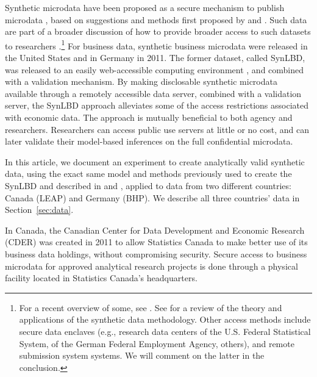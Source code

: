 Synthetic microdata have been proposed as a secure mechanism to publish microdata \citep{RePEc:spr:alstar:v:95:y:2011:i:1:p:1-26,RePEc:taf:japsta:v:39:y:2012:i:2:p:243-265,NAP11844,SJIAOS-2014c}, based on suggestions and methods first proposed by \citet{rubin93} and \citet{little93}. Such data are  part of a broader discussion of how  to provide broader access to such datasets to researchers  \citep{Bender2009,Vilhuber2013,AbowdLane2004,AbowdSchmutte_BPEA2015}.\footnote{
	For a recent overview of some, see \citet{VilhuberAbowdReiter:Synthetic:SJIAOS:2016}. See \citet{dre:2011} for a review of the theory and applications of the synthetic data methodology.
	Other access methods include secure data enclaves (e.g., research data centers of the U.S. Federal Statistical System, of the  German Federal Employment Agency, others), and  remote submission system systems. We will comment on the latter in the conclusion. }
For business data, synthetic business microdata were released in the United States \citep{KinneyEtAl2011} and in Germany  \citep{RePEc:iab:iabfme:201101_de} in 2011. The former dataset, called \ac{SynLBD}, was  released to an easily web-accessible computing environment \citep{AbowdVilhuber2010}, and combined with a validation mechanism.  By making disclosable synthetic microdata available through a remotely accessible data server, combined with a validation server, the SynLBD approach alleviates some of the access restrictions associated with economic data. The approach is mutually beneficial to both agency and researchers. Researchers can access public use servers at little or no cost, and can later validate their model-based inferences on the full confidential microdata.


In this article, we document an experiment to create analytically valid synthetic data, using the exact same model and methods previously used to create the \ac{SynLBD} and described in  \citet[henceforth KRRMJA]{KinneyEtAl2011} and \citet{RePEc:cen:tnotes:11-01}, applied to data from two different countries: Canada (\ac{LEAP}) and Germany (\ac{BHP}). We describe all three countries' data in Section~\ref{sec:data}. 


In Canada, the Canadian Center for Data Development and Economic Research (CDER) was created in 2011 to allow Statistics Canada to make better use of its business data holdings, without compromising security. Secure access  to business microdata for approved analytical research projects is done through a physical facility located in Statistics Canada’s headquarters. 

